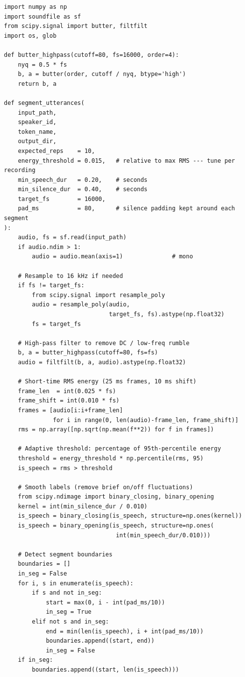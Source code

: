 \documentclass[12pt,a4paper]{article}
\begin{document}
\begin{lstlisting}[caption={Audio segmentation script using energy-based VAD.},
                   label={lst:segment}]
import numpy as np
import soundfile as sf
from scipy.signal import butter, filtfilt
import os, glob

def butter_highpass(cutoff=80, fs=16000, order=4):
    nyq = 0.5 * fs
    b, a = butter(order, cutoff / nyq, btype='high')
    return b, a

def segment_utterances(
    input_path,
    speaker_id,
    token_name,
    output_dir,
    expected_reps    = 10,
    energy_threshold = 0.015,   # relative to max RMS --- tune per recording
    min_speech_dur   = 0.20,    # seconds
    min_silence_dur  = 0.40,    # seconds
    target_fs        = 16000,
    pad_ms           = 80,      # silence padding kept around each segment
):
    audio, fs = sf.read(input_path)
    if audio.ndim > 1:
        audio = audio.mean(axis=1)              # mono

    # Resample to 16 kHz if needed
    if fs != target_fs:
        from scipy.signal import resample_poly
        audio = resample_poly(audio,
                              target_fs, fs).astype(np.float32)
        fs = target_fs

    # High-pass filter to remove DC / low-freq rumble
    b, a = butter_highpass(cutoff=80, fs=fs)
    audio = filtfilt(b, a, audio).astype(np.float32)

    # Short-time RMS energy (25 ms frames, 10 ms shift)
    frame_len  = int(0.025 * fs)
    frame_shift = int(0.010 * fs)
    frames = [audio[i:i+frame_len]
              for i in range(0, len(audio)-frame_len, frame_shift)]
    rms = np.array([np.sqrt(np.mean(f**2)) for f in frames])

    # Adaptive threshold: percentage of 95th-percentile energy
    threshold = energy_threshold * np.percentile(rms, 95)
    is_speech = rms > threshold

    # Smooth labels (remove brief on/off fluctuations)
    from scipy.ndimage import binary_closing, binary_opening
    kernel = int(min_silence_dur / 0.010)
    is_speech = binary_closing(is_speech, structure=np.ones(kernel))
    is_speech = binary_opening(is_speech, structure=np.ones(
                                int(min_speech_dur/0.010)))

    # Detect segment boundaries
    boundaries = []
    in_seg = False
    for i, s in enumerate(is_speech):
        if s and not in_seg:
            start = max(0, i - int(pad_ms/10))
            in_seg = True
        elif not s and in_seg:
            end = min(len(is_speech), i + int(pad_ms/10))
            boundaries.append((start, end))
            in_seg = False
    if in_seg:
        boundaries.append((start, len(is_speech)))


\end{lstlisting}
\end{document}
